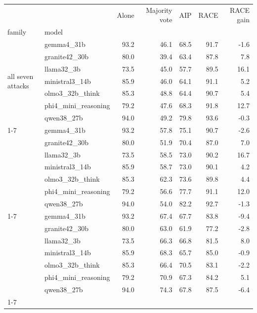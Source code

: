 \begin{tabular}{llrrrrr}
\toprule
 &  & Alone & Majority vote & AIP & RACE & RACE gain \\
family & model &  &  &  &  &  \\
\midrule
\multirow[t]{7}{*}{all seven attacks} & gemma4\_31b & 93.2 & 46.1 & 68.5 & 91.7 & -1.6 \\
 & granite42\_30b & 80.0 & 39.4 & 63.4 & 87.8 & 7.8 \\
 & llama32\_3b & 73.5 & 45.0 & 57.7 & 89.5 & 16.1 \\
 & ministral3\_14b & 85.9 & 46.0 & 64.1 & 91.1 & 5.2 \\
 & olmo3\_32b\_think & 85.3 & 48.8 & 64.4 & 90.7 & 5.4 \\
 & phi4\_mini\_reasoning & 79.2 & 47.6 & 68.3 & 91.8 & 12.7 \\
 & qwen38\_27b & 94.0 & 49.2 & 79.8 & 93.6 & -0.3 \\
\cline{1-7}
\multirow[t]{7}{*}{LLM deceivers} & gemma4\_31b & 93.2 & 57.8 & 75.1 & 90.7 & -2.6 \\
 & granite42\_30b & 80.0 & 51.9 & 70.4 & 87.0 & 7.0 \\
 & llama32\_3b & 73.5 & 58.5 & 73.0 & 90.2 & 16.7 \\
 & ministral3\_14b & 85.9 & 58.7 & 73.0 & 90.1 & 4.2 \\
 & olmo3\_32b\_think & 85.3 & 62.3 & 73.6 & 89.8 & 4.4 \\
 & phi4\_mini\_reasoning & 79.2 & 56.6 & 77.7 & 91.1 & 12.0 \\
 & qwen38\_27b & 94.0 & 54.0 & 82.2 & 92.7 & -1.3 \\
\cline{1-7}
\multirow[t]{7}{*}{camouflage} & gemma4\_31b & 93.2 & 67.4 & 67.7 & 83.8 & -9.4 \\
 & granite42\_30b & 80.0 & 63.0 & 61.9 & 77.2 & -2.8 \\
 & llama32\_3b & 73.5 & 66.3 & 66.8 & 81.5 & 8.0 \\
 & ministral3\_14b & 85.9 & 68.3 & 65.7 & 85.0 & -0.9 \\
 & olmo3\_32b\_think & 85.3 & 66.4 & 70.5 & 83.1 & -2.2 \\
 & phi4\_mini\_reasoning & 79.2 & 70.9 & 67.3 & 84.2 & 5.1 \\
 & qwen38\_27b & 94.0 & 74.3 & 67.8 & 87.5 & -6.4 \\
\cline{1-7}
\bottomrule
\end{tabular}
